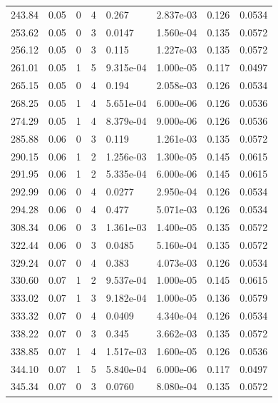 \documentclass[preview]{standalone}
\begin{document}
{{{\begin{tabular}{L{1.2cm}C{1.2cm} C{0.3cm}C{0.5cm} C{1.4cm}C{1.4cm} C{1.4cm}C{1.4cm}}
  243.84  &  0.05  & 0     &  4 &  0.267  & 2.837e-03  & 0.126 &  0.0534   \\ 
  253.62  &  0.05  & 0     &  3 &  0.0147  & 1.560e-04  & 0.135 &  0.0572   \\ 
  256.12  &  0.05  & 0     &  3 &  0.115  & 1.227e-03  & 0.135 &  0.0572   \\ 
  261.01  &  0.05  & 1     &  5 &  9.315e-04  & 1.000e-05  & 0.117 &  0.0497   \\ 
  265.15  &  0.05  & 0     &  4 &  0.194  & 2.058e-03  & 0.126 &  0.0534   \\ 
  268.25  &  0.05  & 1     &  4 &  5.651e-04  & 6.000e-06  & 0.126 &  0.0536   \\ 
  274.29  &  0.05  & 1     &  4 &  8.379e-04  & 9.000e-06  & 0.126 &  0.0536   \\ 
  285.88  &  0.06  & 0     &  3 &  0.119  & 1.261e-03  & 0.135 &  0.0572   \\ 
  290.15  &  0.06  & 1     &  2 &  1.256e-03  & 1.300e-05  & 0.145 &  0.0615   \\ 
  291.95  &  0.06  & 1     &  2 &  5.335e-04  & 6.000e-06  & 0.145 &  0.0615   \\ 
  292.99  &  0.06  & 0     &  4 &  0.0277  & 2.950e-04  & 0.126 &  0.0534   \\ 
  294.28  &  0.06  & 0     &  4 &  0.477  & 5.071e-03  & 0.126 &  0.0534   \\ 
  308.34  &  0.06  & 0     &  3 &  1.361e-03  & 1.400e-05  & 0.135 &  0.0572   \\ 
  322.44  &  0.06  & 0     &  3 &  0.0485  & 5.160e-04  & 0.135 &  0.0572   \\ 
  329.24  &  0.07  & 0     &  4 &  0.383  & 4.073e-03  & 0.126 &  0.0534   \\ 
  330.60  &  0.07  & 1     &  2 &  9.537e-04  & 1.000e-05  & 0.145 &  0.0615   \\ 
  333.02  &  0.07  & 1     &  3 &  9.182e-04  & 1.000e-05  & 0.136 &  0.0579   \\ 
  333.32  &  0.07  & 0     &  4 &  0.0409  & 4.340e-04  & 0.126 &  0.0534   \\ 
  338.22  &  0.07  & 0     &  3 &  0.345  & 3.662e-03  & 0.135 &  0.0572   \\ 
  338.85  &  0.07  & 1     &  4 &  1.517e-03  & 1.600e-05  & 0.126 &  0.0536   \\ 
  344.10  &  0.07  & 1     &  5 &  5.840e-04  & 6.000e-06  & 0.117 &  0.0497   \\ 
  345.34  &  0.07  & 0     &  3 &  0.0760  & 8.080e-04  & 0.135 &  0.0572   \\ 

\end{tabular}}}}
\end{document}
